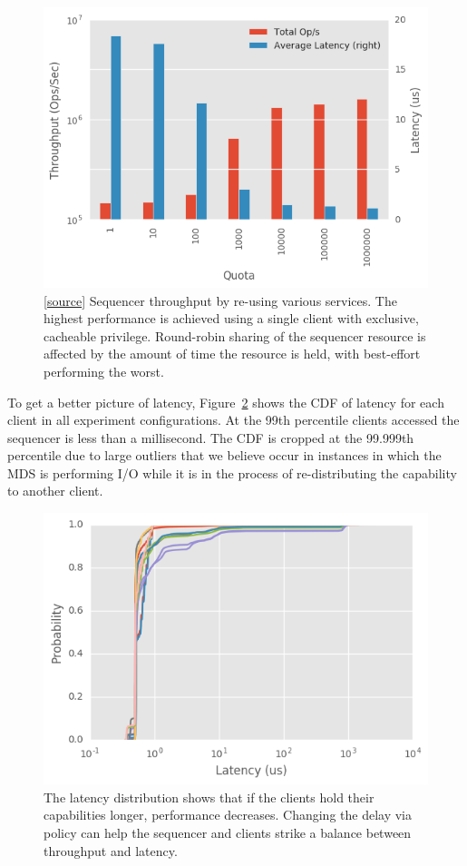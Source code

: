 \documentclass[preprint]{sigplanconf-eurosys}
\begin{document}
\begin{figure}[h]
\centering
\includegraphics{figures/tradeoff.png}
\caption{[\href{https://github.com/double-blind-submitter/osdi16}{source}]
Sequencer throughput by re-using various services.  The highest performance is
achieved using a single client with exclusive, cacheable privilege. Round-robin
sharing of the sequencer resource is affected by the amount of time the
resource is held, with best-effort performing the worst.}
\label{fig:captp}
\end{figure}

To get a better picture of latency, Figure~\ref{fig:capcdf} shows the CDF of
latency for each client in all experiment configurations. At the 99th
percentile clients accessed the sequencer is less than a millisecond. The CDF
is cropped at the 99.999th percentile due to large outliers that we believe
occur in instances in which the MDS is performing I/O while it is in the
process of re-distributing the capability to another client.

\begin{figure}[h]
\centering
\includegraphics{figures/caps-delay-latency.png}
\caption{
The latency distribution shows that if the clients hold their capabilities longer,
performance decreases. Changing the delay via policy can help the sequencer and
clients strike a balance between throughput and latency.}
\label{fig:capcdf}
\end{figure}
\end{document}
